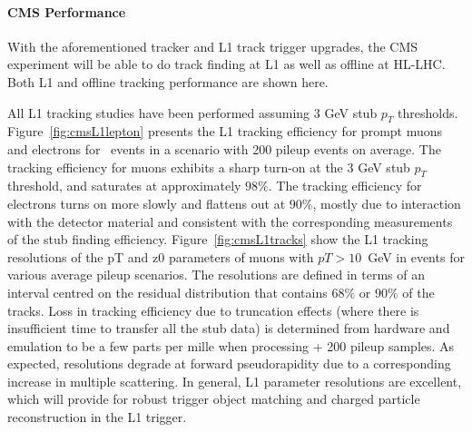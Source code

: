 \paragraph{CMS Performance} 

With the aforementioned tracker and L1 track trigger upgrades, the CMS experiment will be able to do track finding at L1 as well as offline at HL-LHC. Both L1 and offline tracking performance are shown here. 

All L1 tracking studies have been performed assuming 3 GeV stub $p_T$ thresholds.
Figure~\ref{fig:cmsL1lepton} presents the L1 tracking efficiency for prompt muons and electrons for \ttbar~events in a scenario with 200 pileup events on average. 
The tracking efficiency for muons exhibits a sharp turn-on at the 3 GeV stub $p_T$ threshold, and saturates at approximately $98\%$. 
The tracking efficiency for electrons turns on more slowly and flattens out at $90\%$, mostly due to interaction with the detector material and consistent with the corresponding measurements of the stub finding efficiency. 
Figure~\ref{fig:cmsL1tracks} show the L1 tracking resolutions of the pT and z0 parameters of muons with $pT>10$~GeV in \ttbar events for various average pileup scenarios. The resolutions are defined in terms of an interval
centred on the residual distribution that contains $68\%$ or $90\%$ of the tracks.
Loss in tracking efficiency due to truncation effects (where there is insufficient time to transfer all the stub data) is determined from hardware and emulation to be a few parts per mille when processing \ttbar + 200 pileup samples.
As expected, resolutions degrade at forward pseudorapidity due to a corresponding increase in multiple scattering. 
In general, L1 parameter resolutions are excellent, which will provide for robust trigger object matching and charged particle reconstruction in the L1 trigger.

